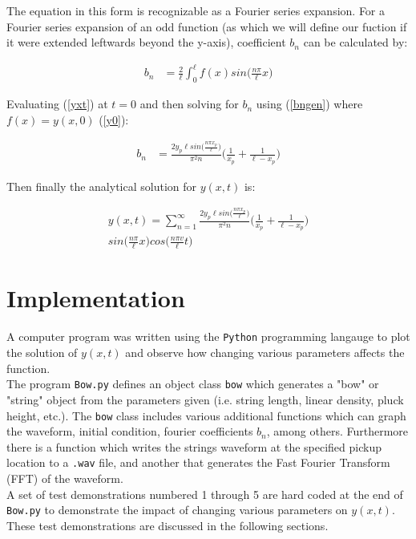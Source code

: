 \documentclass[%
 reprint,
 amsmath,amssymb,
 aps,
]{revtex4-1}
\begin{document}
The equation in this form is recognizable as a Fourier series expansion. For a Fourier series expansion of an odd function (as which we will define our fuction if it were extended leftwards beyond the y-axis), coefficient $b_n$ can be calculated by:

\begin{align}
b_n &= \frac{2}{\ell} \int_{0}^{\ell} f(x)sin\Big(\frac{n\pi}{\ell}x\Big) \label{bngen}
\end{align}

Evaluating (\ref{yxt}) at $t=0$ and then solving for $b_n$ using (\ref{bngen}) where $f(x) = y(x,0)$ (\ref{y0}):

\begin{align}
b_n &= \frac{2y_p\ell sin\Big(\frac{n \pi x_p}{\ell}\Big)}{\pi^2 n}\Big(\frac{1}{x_p} + \frac{1}{\ell-x_p}\Big)
\end{align}

Then finally the analytical solution for $y(x,t)$ is:

\begin{multline}
y(x,t) =\sum_{n=1}^{\infty} \frac{2y_p\ell sin\Big(\frac{n \pi x_p}{\ell}\Big)}{\pi^2 n}\Big(\frac{1}{x_p} + \frac{1}{\ell-x_p}\Big) \\ sin\Big(\frac{n\pi}{\ell}x\Big)cos\Big(\frac{n\pi v}{\ell}t\Big) \label{yxtfinal}
\end{multline}

\section{\label{sec:level1}Implementation}

A computer program was written using the \texttt{Python} programming langauge to plot the solution of $y(x,t)$ and observe how changing various parameters affects the function.\\

The program \texttt{Bow.py} defines an object class \texttt{bow} which generates a "bow" or "string" object from the parameters given (i.e. string length, linear density, pluck height, etc.). The \texttt{bow} class includes various additional functions which can graph the waveform, initial condition, fourier coefficients $b_n$, among others. Furthermore there is a function which writes the strings waveform at the specified pickup location to a \texttt{.wav} file, and another that generates the Fast Fourier Transform (FFT) of the waveform. \\

A set of test demonstrations numbered 1 through 5 are hard coded at the end of \texttt{Bow.py} to demonstrate the impact of changing various parameters on $y(x,t)$. These test demonstrations are discussed in the following sections.\\ 
\end{document}
